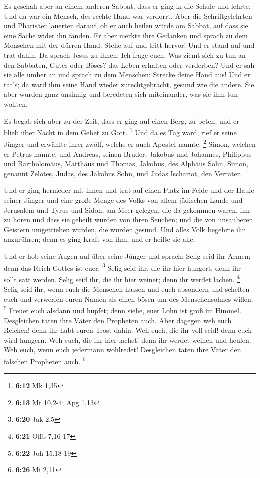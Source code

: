  Es geschah aber an einem anderen Sabbat, dass er ging in
die Schule und lehrte. Und da war ein Mensch, des rechte Hand war
verdorrt.  Aber die Schriftgelehrten und Pharisäer
lauerten darauf, ob er auch heilen würde am Sabbat, auf dass sie eine
Sache wider ihn fänden.  Er aber merkte ihre Gedanken und
sprach zu dem Menschen mit der dürren Hand: Stehe auf und tritt hervor!
Und er stand auf und trat dahin.  Da sprach Jesus zu
ihnen: Ich frage euch: Was ziemt sich zu tun an den Sabbaten, Gutes oder
Böses? das Leben erhalten oder verderben?  Und er sah sie
alle umher an und sprach zu dem Menschen: Strecke deine Hand aus! Und er
tat's; da ward ihm seine Hand wieder zurechtgebracht, gesund wie die
andere.  Sie aber wurden ganz unsinnig und beredeten sich
miteinander, was sie ihm tun wollten.

 Es begab sich aber zu der Zeit, dass er ging auf einen
Berg, zu beten; und er blieb über Nacht in dem Gebet zu Gott.
\footnote{\textbf{6:12} Mk 1,35}  Und da es Tag ward,
rief er seine Jünger und erwählte ihrer zwölf, welche er auch Apostel
nannte: \footnote{\textbf{6:13} Mt 10,2-4; Apg 1,13} 
Simon, welchen er Petrus nannte, und Andreas, seinen Bruder, Jakobus und
Johannes, Philippus und Bartholomäus,  Matthäus und
Thomas, Jakobus, des Alphäus Sohn, Simon, genannt Zelotes,
 Judas, des Jakobus Sohn, und Judas Ischariot, den
Verräter.

 Und er ging hernieder mit ihnen und trat auf einen Platz
im Felde und der Haufe seiner Jünger und eine große Menge des Volks von
allem jüdischen Lande und Jerusalem und Tyrus und Sidon, am Meer
gelegen,  die da gekommen waren, ihn zu hören und dass
sie geheilt würden von ihren Seuchen; und die von unsauberen Geistern
umgetrieben wurden, die wurden gesund.  Und alles Volk
begehrte ihn anzurühren; denn es ging Kraft von ihm, und er heilte sie
alle.

 Und er hob seine Augen auf über seine Jünger und sprach:
Selig seid ihr Armen; denn das Reich Gottes ist euer. \footnote{\textbf{6:20}
  Jak 2,5}  Selig seid ihr, die ihr hier hungert; denn
ihr sollt satt werden. Selig seid ihr, die ihr hier weinet; denn ihr
werdet lachen. \footnote{\textbf{6:21} Offb 7,16-17} 
Selig seid ihr, wenn euch die Menschen hassen und euch absondern und
schelten euch und verwerfen euren Namen als einen bösen um des
Menschensohnes willen. \footnote{\textbf{6:22} Joh 15,18-19}
 Freuet euch alsdann und hüpfet; denn siehe, euer Lohn
ist groß im Himmel. Desgleichen taten ihre Väter den Propheten auch.
 Aber dagegen weh euch Reichen! denn ihr habt euren Trost
dahin.  Weh euch, die ihr voll seid! denn euch wird
hungern. Weh euch, die ihr hier lachet! denn ihr werdet weinen und
heulen.  Weh euch, wenn euch jedermann wohlredet!
Desgleichen taten ihre Väter den falschen Propheten auch. \footnote{\textbf{6:26}
  Mi 2,11}

